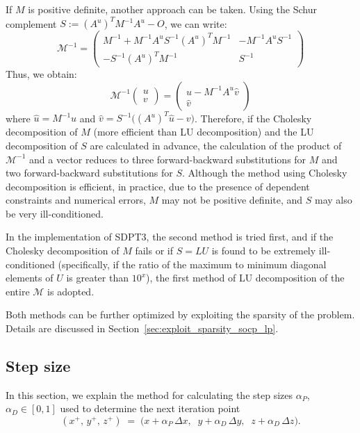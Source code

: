 If $M$ is positive definite, another approach can be taken. Using the Schur complement $S := (A^u)^T M^{-1} A^u - O$, we can write:
\[
\mathcal{M}^{-1}=\begin{pmatrix}
    M^{-1} + M^{-1} A^u S^{-1} (A^u)^T M^{-1} & -M^{-1} A^u S^{-1} \\
    -S^{-1} (A^u)^T M^{-1} & S^{-1}
\end{pmatrix}
\]
Thus, we obtain:
\[
    \mathcal{M}^{-1}\begin{pmatrix}u \\ v \end{pmatrix} = \begin{pmatrix} \hat{u} - M^{-1} A^u \hat{v} \\ \hat{v} \end{pmatrix}
\]
where $\hat{u} = M^{-1} u$ and $\hat{v} = S^{-1}\big((A^u)^T \hat{u} - v \big)$.
Therefore, if the Cholesky decomposition of $M$ (more efficient than LU decomposition) and the LU decomposition of $S$ are calculated in advance, the calculation of the product of $\mathcal{M}^{-1}$ and a vector reduces to three forward-backward substitutions for $M$ and two forward-backward substitutions for $S$.
Although the method using Cholesky decomposition is efficient, in practice, due to the presence of dependent constraints and numerical errors, $M$ may not be positive definite, and $S$ may also be very ill-conditioned.

In the implementation of SDPT3, the second method is tried first, and if the Cholesky decomposition of $M$ fails or if $S=LU$ is found to be extremely ill-conditioned (specifically, if the ratio of the maximum to minimum diagonal elements of $U$ is greater than $10^{x}$), the first method of LU decomposition of the entire $\mathcal{M}$ is adopted.

Both methods can be further optimized by exploiting the sparsity of the problem. Details are discussed in Section~\ref{sec:exploit_sparsity_socp_lp}.




\subsection{Step size} \label{sec:step_size}
In this section, we explain the method for calculating the step sizes $\alpha_P$, $\alpha_D \in [0, 1]$ used to determine the next iteration point 
\[
  (x^+,\,y^+,\,z^+) 
  \;=\; 
  \bigl(x + \alpha_P\,\Delta x,\;\; y + \alpha_D\,\Delta y,\;\; z + \alpha_D\,\Delta z\bigr).
\]

